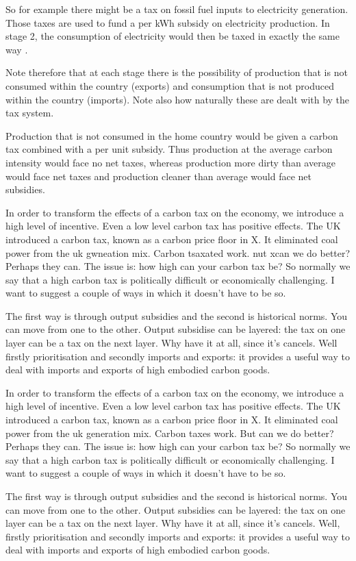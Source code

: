 \documentclass[]{tufte-handout}
\begin{document}
So for example there might be a tax on fossil fuel inputs to electricity
generation. Those taxes are used to fund a per kWh subsidy on
electricity production. In stage 2, the consumption of electricity would
then be taxed in exactly the same way .

Note therefore that at each stage there is the possibility of production
that is not consumed within the country (exports) and consumption that
is not produced within the country (imports). Note also how naturally
these are dealt with by the tax system.

Production that is not consumed in the home country would be given a
carbon tax combined with a per unit subsidy. Thus production at the
average carbon intensity would face no net taxes, whereas production
more dirty than average would face net taxes and production cleaner than
average would face net subsidies.

In order to transform the effects of a carbon tax on the economy, we
introduce a high level of incentive. Even a low level carbon tax has
positive effects. The UK introduced a carbon tax, known as a carbon
price floor in X. It eliminated coal power from the uk gwneation mix.
Carbon tsaxated work. nut xcan we do better? Perhaps they can. The issue
is: how high can your carbon tax be? So normally we say that a high
carbon tax is politically difficult or economically challenging. I want
to suggest a couple of ways in which it doesn't have to be so.

The first way is through output subsidies and the second is historical
norms. You can move from one to the other. Output subsidise can be
layered: the tax on one layer can be a tax on the next layer. Why have
it at all, since it's cancels. Well firstly prioritisation and secondly
imports and exports: it provides a useful way to deal with imports and
exports of high embodied carbon goods.

In order to transform the effects of a carbon tax on the economy, we
introduce a high level of incentive. Even a low level carbon tax has
positive effects. The UK introduced a carbon tax, known as a carbon
price floor in X. It eliminated coal power from the uk generation mix.
Carbon taxes work. But can we do better? Perhaps they can. The issue is:
how high can your carbon tax be? So normally we say that a high carbon
tax is politically difficult or economically challenging. I want to
suggest a couple of ways in which it doesn't have to be so.

The first way is through output subsidies and the second is historical
norms. You can move from one to the other. Output subsidies can be
layered: the tax on one layer can be a tax on the next layer. Why have
it at all, since it's cancels. Well, firstly prioritisation and secondly
imports and exports: it provides a useful way to deal with imports and
exports of high embodied carbon goods.
\end{document}
